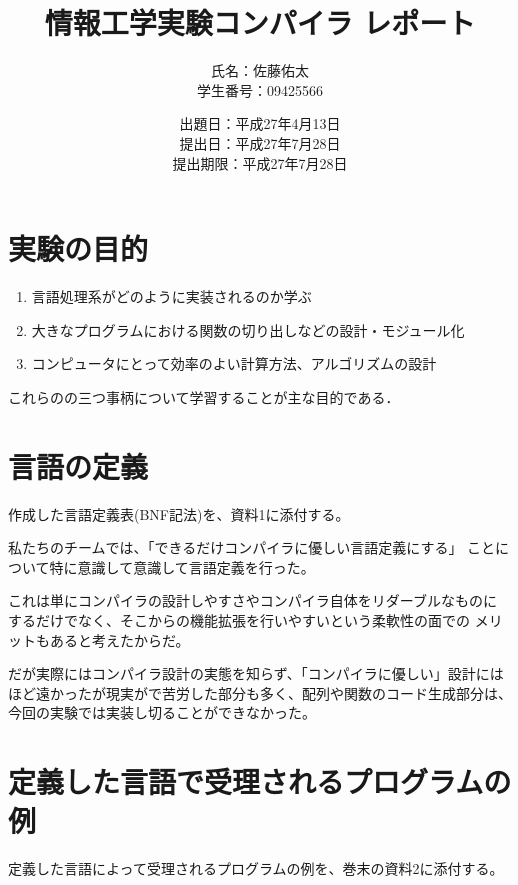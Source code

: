 \documentclass[11pt,a4j]{jarticle}
\title{情報工学実験コンパイラ レポート}
\author{氏名：佐藤佑太\\学生番号：09425566}
\date{出題日：平成27年4月13日\\提出日：平成27年7月28日\\提出期限：平成27年7月28日}
\begin{document}
\maketitle
\newpage



\section{実験の目的}

\begin{enumerate}
\item {言語処理系がどのように実装されるのか学ぶ}
\item {大きなプログラムにおける関数の切り出しなどの設計・モジュール化}
\item {コンピュータにとって効率のよい計算方法、アルゴリズムの設計}
\end{enumerate}
これらのの三つ事柄について学習することが主な目的である．




\section{言語の定義}

作成した言語定義表(BNF記法)を、資料1に添付する。

\vspace{0.2in}

私たちのチームでは、「できるだけコンパイラに優しい言語定義にする」
ことについて特に意識して意識して言語定義を行った。

これは単にコンパイラの設計しやすさやコンパイラ自体をリダーブルなものに
するだけでなく、そこからの機能拡張を行いやすいという柔軟性の面での
メリットもあると考えたからだ。

だが実際にはコンパイラ設計の実態を知らず、「コンパイラに優しい」設計には
ほど遠かったが現実がで苦労した部分も多く、配列や関数のコード生成部分は、
今回の実験では実装し切ることができなかった。




\section{定義した言語で受理されるプログラムの例}


定義した言語によって受理されるプログラムの例を、巻末の資料2に添付する。
\end{document}
